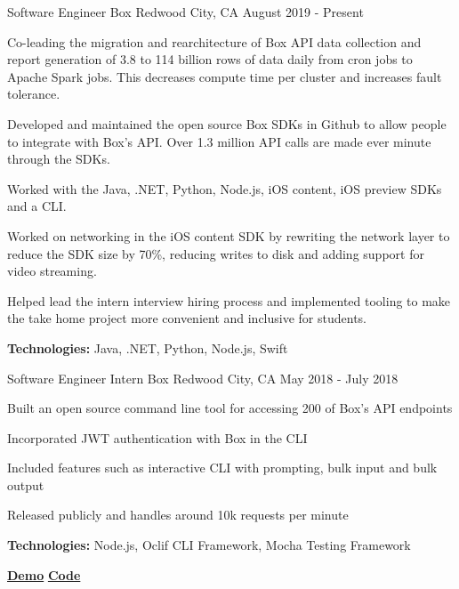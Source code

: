 
\begin{cventries}
  \cventry
    {Software Engineer} %
    {Box} %
    {Redwood City, CA} %
    {August 2019 - Present} %
    {
      \begin{cvitems} %
        \item{Co-leading the migration and rearchitecture of Box API data collection and report generation of 3.8 to 114 billion rows of data daily from cron jobs to Apache Spark jobs. This decreases compute time per cluster and increases fault tolerance.}
        \item{Developed and maintained the open source Box SDKs in Github to allow people to integrate with Box's API. Over 1.3 million API calls are made ever minute through the SDKs.}
        \item{Worked with the Java, .NET, Python, Node.js, iOS content, iOS preview SDKs and a CLI.}
        \item{Worked on networking in the iOS content SDK by rewriting the network layer to reduce the SDK size by 70\%, reducing writes to disk and adding support for video streaming.}
        \item{Helped lead the intern interview hiring process and implemented tooling to make the take home project more convenient and inclusive for students.}
        {\setlength \itemindent{-2ex} \itemsep2pt \item[] \textbf{Technologies:} Java, .NET, Python, Node.js, Swift}
        {\setlength \itemindent{-2ex} \itemsep2pt \item[] 
        \href{https://sujaygarlanka.com/experience.html\#box}{ \faInfoCircle \textbf{\color{awesome}{ Details}}}
        \href{https://github.com/box/sdks}{ \faGithub \textbf{\color{awesome}{ Code}}}}
      \end{cvitems}
    }
    
  \cventry
    {Software Engineer Intern} %
    {Box} %
    {Redwood City, CA} %
    {May 2018 - July 2018} %
    {
      \begin{cvitems} %
        \item{Built an open source command line tool for accessing 200 of Box’s API endpoints}
        \item{Incorporated JWT authentication with Box in the CLI}
        \item{Included features such as interactive CLI with prompting, bulk input and bulk output}
        \item{Released publicly and handles around 10k requests per minute}
        {\setlength \itemindent{-2ex} \itemsep2pt \item[] \textbf{Technologies:} Node.js, Oclif CLI Framework, Mocha Testing Framework}
        {\setlength \itemindent{-2ex} \itemsep2pt \item[]  \href{https://sujaygarlanka.com/experience.html\#internship}{ \faPlayCircle \textbf{ Demo}} \href{https://github.com/box/boxcli}{ \faGithub \textbf{ Code}}}
      \end{cvitems}
    }


\end{cventries}
